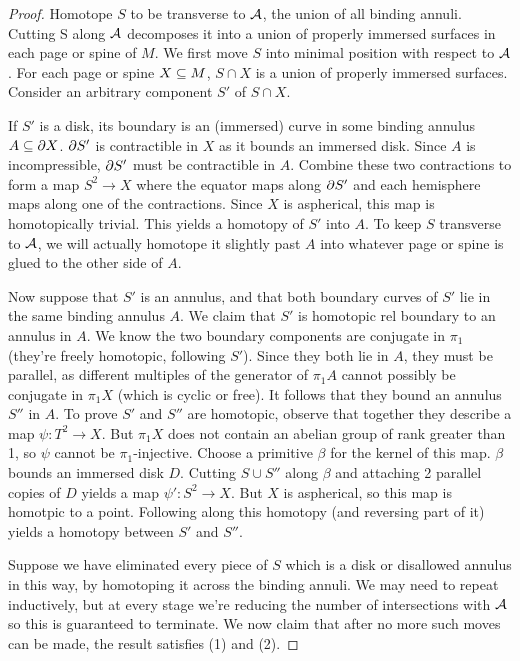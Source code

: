 \begin{proof}

Homotope $S$ to be transverse to $\mathcal{A}$, the union of all binding annuli.
Cutting S along $\mathcal{A}$ decomposes it into a union of properly immersed surfaces
in each page or spine of $M$. We first move $S$ into minimal position with
respect to $\mathcal{A}$.  For each page or spine $X \subseteq M$, $S \cap X$ is a union of
properly immersed surfaces. Consider an arbitrary component $S'$ of $S \cap X$.

If $S'$ is a disk, its boundary is an (immersed) curve in some binding annulus
$A \subseteq \partial X$. $\partial S'$ is contractible in $X$ as it bounds an immersed disk.
Since $A$ is incompressible, $\partial S'$ must be contractible in $A$. Combine
these two contractions to form a map $S^2 \to X$ where the equator maps along
$\partial S'$ and each hemisphere maps along one of the contractions. Since $X$ is
aspherical, this map is homotopically trivial. This yields a homotopy of $S'$
into $A$.  To keep $S$ transverse to $\mathcal{A}$, we will actually homotope it
slightly past $A$ into whatever page or spine is glued to the other side of
$A$.

Now suppose that $S'$ is an annulus, and that both boundary curves of $S'$ lie
in the same binding annulus $A$. We claim that $S'$ is homotopic rel boundary
to an annulus in $A$. We know the two boundary components are conjugate in
$\pi_1$ (they're freely homotopic, following $S'$). Since they both lie in $A$,
they must be parallel, as different multiples of the generator of $\pi_1A$
cannot possibly be conjugate in $\pi_1X$ (which is cyclic or free). It follows
that they bound an annulus $S''$ in $A$.  To prove $S'$ and $S''$ are
homotopic, observe that together they describe a map $\psi\colon T^2 \to X$.
But $\pi_1X$ does not contain an abelian group of rank greater than 1, so
$\psi$ cannot be $\pi_1$-injective.  Choose a primitive $\beta$ for the kernel
of this map. $\beta$ bounds an immersed disk $D$.  Cutting $S \cup S''$ along
$\beta$ and attaching 2 parallel copies of $D$ yields a map $\psi'\colon S^2
\to X$.  But $X$ is aspherical, so this map is homotpic to a point. Following
along this homotopy (and reversing part of it) yields a homotopy between $S'$
and $S''$.

Suppose we have eliminated every piece of $S$ which is a disk or disallowed
annulus in this way, by homotoping it across the binding annuli. We may need to
repeat inductively, but at every stage we're reducing the number of
intersections with $\mathcal{A}$ so this is guaranteed to terminate. We now claim that
after no more such moves can be made, the result satisfies (1) and (2).


\end{proof}

